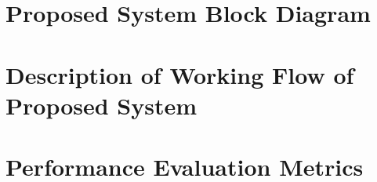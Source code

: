 \section{Proposed System Block Diagram}
    \begin{figure}[hbt!]
    \end{figure}

\section{Description of Working Flow of Proposed System}
\section{Performance Evaluation Metrics}